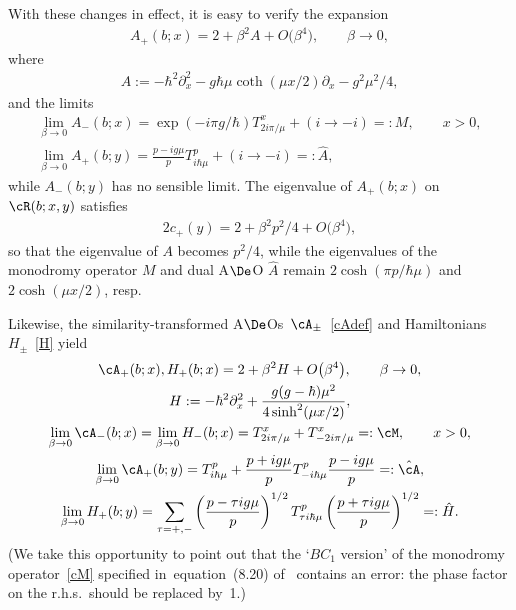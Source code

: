 \documentclass[pdftex]{sigma}
\numberwithin{equation}{section}
\begin{document}
With these changes in ef\/fect, it is easy to verify the expansion
\begin{gather}
A_+(b;x)= 2+ \beta^2 A +O\big(\beta^4\big),\qquad \beta \to 0,
\end{gather}
where
\begin{gather}
A:= -\hbar^2 \partial_x^2-g\hbar \mu \coth (\mu x/2)\partial_x-g^2\mu^2/4,
\end{gather}
and the limits
\begin{gather}
\lim_{\beta \to 0}A_-(b;x)=\exp(-i\pi g/\hbar)T_{2i\pi/\mu}^x +(i\to -i)=:M,\qquad x>0,
\\
\lim_{\beta \to 0}A_+(b;y)=\frac{p-ig\mu}{p}T_{i\hbar \mu}^p+(i\to -i)=: \hat{A},
\end{gather}
while $A_-(b;y)$ has no sensible limit. The eigenvalue of $A_+(b;x)$ on $\cR(b;x,y)$ satisf\/ies
\begin{gather}\label{cpexp}
2c_+(y)=
2+\beta^2 p^2/4 +O\big(\beta^4\big),
\end{gather}
so that the eigenvalue of $A$ becomes $p^2/4$, while the eigenvalues of the monodromy operator $M$ and dual A$\De$O $\hat{A}$ remain $2\cosh(\pi p/\hbar\mu)$ and $2\cosh(\mu x/2)$, resp.

Likewise, the similarity-transformed A$\De$Os~$\cA_{\pm}$~\eqref{cAdef} and Hamiltonians~$H_{\pm}$~\eqref{H} yield
\begin{gather}
\cA_+(b;x),H_+(b;x)= 2+ \beta^2 H +O\big(\beta^4\big),\qquad \beta \to 0,
\\
H:=  -\hbar^2 \partial_x^2+\frac{g(g-\hbar)\mu^2}{4\sinh^2(\mu x/2)},
\\
\label{cM}
\lim_{\beta \to 0}\cA_-(b;x)=\lim_{\beta \to 0}H_-(b;x)= T_{2i\pi/\mu}^x+T_{-2i\pi/\mu}^x=:\cM,\qquad x>0,
\\
\lim_{\beta \to 0}\cA_+(b;y)=T_{i\hbar \mu}^p+\frac{p+ig\mu}{p}T_{-i\hbar \mu}^p\frac{p-ig\mu}{p}=:\hat{\cA},
\\
\lim_{\beta \to 0}H_+(b;y)=
\sum_{\tau=+,-}\left( \frac{p-\tau ig\mu}{p}\right)^{1/2}T^p_{\tau i\hbar\mu}\left(\frac{p+\tau ig\mu}{p}\right)^{1/2}=:\hat{H}.
\end{gather}
(We take this opportunity to point out that the `$BC_1$ version' of the monodromy operator~\eqref{cM} specif\/ied in~equation~(8.20) of~\cite{Rsurv} contains an error: the phase factor on the r.h.s.\ should be replaced by~1.)
\end{document}
